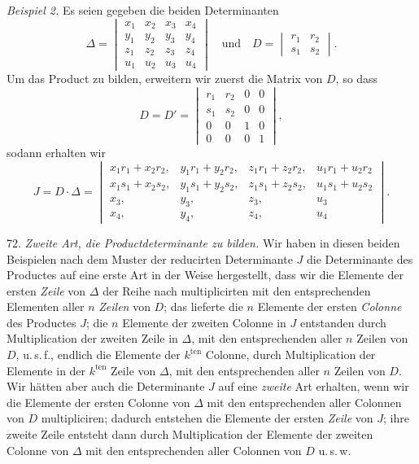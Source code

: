 \textit{Beispiel 2.} Es seien gegeben die beiden Determinanten
\[
\Delta = \begin{vmatrix} x_1 & x_2 & x_3 & x_4 \\ y_1 & y_2 & y_3 & y_4 \\ z_1 & z_2 & z_3 & z_4 \\ u_1 & u_2 & u_3 & u_4 \end{vmatrix}
\quad \text{und} \quad
D = \begin{vmatrix} r_1 & r_2 \\ s_1 & s_2 \end{vmatrix}.
\]
Um das Product zu bilden, erweitern wir zuerst die Matrix von $D$, so
dass
\[
D = D' = \begin{vmatrix} r_1 & r_2 & 0 & 0 \\ s_1 & s_2 & 0 & 0 \\ 0 & 0 & 1 & 0 \\ 0 & 0 & 0 & 1 \end{vmatrix},
\]
sodann erhalten wir
\[
J = D \cdot \Delta =
\begin{vmatrix}
x_1 r_1 + x_2 r_2, & y_1 r_1 + y_2 r_2, & z_1 r_1 + z_2 r_2, & u_1 r_1 + u_2 r_2 \\
x_1 s_1 + x_2 s_2, & y_1 s_1 + y_2 s_2, & z_1 s_1 + z_2 s_2, & u_1 s_1 + u_2 s_2 \\
x_3, & y_3, & z_3, & u_3 \\
x_4, & y_4, & z_4, & u_4
\end{vmatrix}.
\]



72. \textit{Zweite Art, die Productdeterminante zu bilden.} Wir haben in diesen beiden Beispielen nach dem Muster der reducirten Determinante $J$ die Determinante des Productes auf eine erste Art in der Weise hergestellt, dass wir die Elemente der ersten \textit{Zeile} von $\varDelta$ der Reihe nach multiplicirten mit den entsprechenden Elementen aller $n$ \textit{Zeilen} von $D$; das lieferte die $n$ Elemente der ersten \textit{Colonne} des Productes $J$; die $n$ Elemente der zweiten Colonne in $J$ entstanden durch Multiplication der zweiten Zeile in $\varDelta$, mit den entsprechenden aller $n$ Zeilen von $D$, u.\,s.\,f., endlich die Elemente der $k^{\mathrm{ten}}$ Colonne, durch Multiplication der Elemente in der $k^{\mathrm{ten}}$ Zeile von $\varDelta$, mit den entsprechenden aller $n$ Zeilen von $D$. Wir hätten aber auch die Determinante $J$ auf eine \textit{zweite} Art erhalten, wenn wir die Elemente der ersten Colonne von $\varDelta$ mit den entsprechenden aller Colonnen von $D$ multipliciren; dadurch entstehen die Elemente der ersten \textit{Zeile} von $J$; ihre zweite Zeile entsteht dann durch Multiplication der Elemente der zweiten Colonne von $\varDelta$ mit den entsprechenden aller Colonnen von $D$ u.\,s.\,w.

